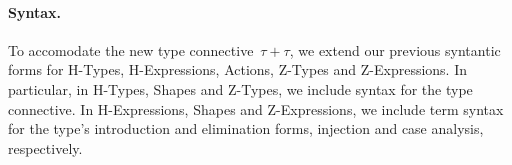 
\newcommand{\TABperformAna}[5]{#1 \vdash & #2                & \xlongrightarrow{#4} & #5 & \Leftarrow #3}
\newcommand{\TABperformSyn}[6]{#1 \vdash & #2 \Rightarrow #3 & \xlongrightarrow{#4} & #5 \Rightarrow #6}
\newcommand{\TABperformTyp}[3]{& #1 & \xlongrightarrow{#2} & #3}

\newcommand{\TABperformMove}[3]{#1 & \xlongrightarrow{#2} & #3}
\newcommand{\TABperformDel}[2]{#1 \xlongrightarrow{\aDel} #2}

\newcommand{\sumhasmatched}[2]{#1 \mathrel{\textcolor{violet}{\blacktriangleright_{+}}} #2}

\paragraph{Syntax.} 
%
To accomodate the new type connective~$\tau + \tau$, we extend our
previous syntantic forms for H-Types, H-Expressions, Actions, Z-Types
and Z-Expressions.
%
In particular,
in H-Types, Shapes and Z-Types, we include syntax for the type connective.
%
In H-Expressions, Shapes and Z-Expressions, we include term syntax
for the type's introduction and elimination forms, injection and case
analysis, respectively.



